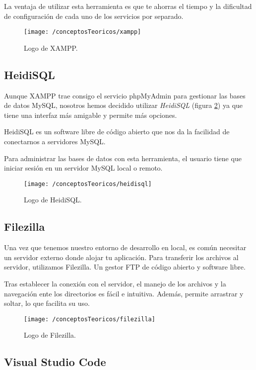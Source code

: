 La ventaja de utilizar esta herramienta es que te ahorras el tiempo y la dificultad de configuración de cada uno de los servicios por separado. 

\begin{figure}[ht]
	\centering
	\texttt{[image: /conceptosTeoricos/xampp]}
	\caption{Logo de XAMPP.}
	\label{fig:xampp}
\end{figure}

\subsection{HeidiSQL}

Aunque XAMPP trae consigo el servicio phpMyAdmin para gestionar las bases de datos MySQL, nosotros hemos decidido utilizar \textit{HeidiSQL} (figura \ref{fig:heidisql}) ya que tiene una interfaz más amigable y permite más opciones.

HeidiSQL es un software libre de código abierto que nos da la facilidad de conectarnos a servidores MySQL.

Para administrar las bases de datos con esta herramienta, el usuario tiene que iniciar sesión en un servidor MySQL local o remoto. 

\begin{figure}[ht]
	\centering
	\texttt{[image: /conceptosTeoricos/heidisql]}
	\caption{Logo de HeidiSQL.}
	\label{fig:heidisql}
\end{figure}

\subsection{Filezilla}

Una vez que tenemos nuestro entorno de desarrollo en local, es común necesitar un servidor externo donde alojar tu aplicación. Para transferir los archivos al servidor, utilizamos Filezilla. Un gestor FTP de código abierto y software libre.

Tras establecer la conexión con el servidor, el manejo de los archivos y la navegación ente los directorios es fácil e intuitiva. Además, permite arrastrar y soltar, lo que facilita su uso.

\begin{figure}[ht]
	\centering
	\texttt{[image: /conceptosTeoricos/filezilla]}
	\caption{Logo de Filezilla.}
	\label{fig:filezilla}
\end{figure}

\subsection{Visual Studio Code}

